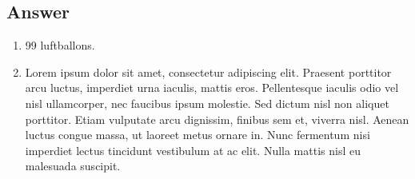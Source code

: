 \documentclass[
	12pt, %
]{fphw}
\begin{document}

\subsection*{Answer}

\begin{enumerate}
	\item 99 luftballons.
	\item Lorem ipsum dolor sit amet, consectetur adipiscing elit. Praesent porttitor arcu luctus, imperdiet urna iaculis, mattis eros. Pellentesque iaculis odio vel nisl ullamcorper, nec faucibus ipsum molestie. Sed dictum nisl non aliquet porttitor. Etiam vulputate arcu dignissim, finibus sem et, viverra nisl. Aenean luctus congue massa, ut laoreet metus ornare in. Nunc fermentum nisi imperdiet lectus tincidunt vestibulum at ac elit. Nulla mattis nisl eu malesuada suscipit.
\end{enumerate}

\end{document}
